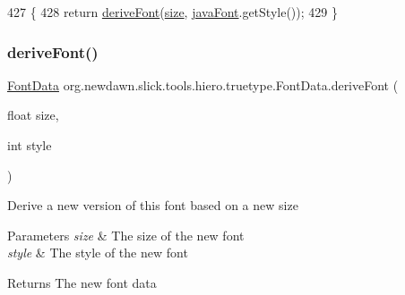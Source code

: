 \begin{DoxyCode}
427                                            \{
428         \textcolor{keywordflow}{return} \mbox{\hyperlink{classorg_1_1newdawn_1_1slick_1_1tools_1_1hiero_1_1truetype_1_1_font_data_a15b684f10d110c105f3343f2651c7291}{deriveFont}}(\mbox{\hyperlink{classorg_1_1newdawn_1_1slick_1_1tools_1_1hiero_1_1truetype_1_1_font_data_a96af538e2a7368fdba46ffc2ad6a9a0e}{size}}, \mbox{\hyperlink{classorg_1_1newdawn_1_1slick_1_1tools_1_1hiero_1_1truetype_1_1_font_data_ab48e0ef57ae93083499407b9998d93a6}{javaFont}}.getStyle());
429     \}
\end{DoxyCode}
\mbox{\label{classorg_1_1newdawn_1_1slick_1_1tools_1_1hiero_1_1truetype_1_1_font_data_adc39e9ffe35a2f9568e99b18cd59e876}} 
\subsubsection{\texorpdfstring{derive\+Font()}{deriveFont()}\hspace{0.1cm}{\footnotesize\ttfamily [2/2]}}
{\footnotesize\ttfamily \mbox{\hyperlink{classorg_1_1newdawn_1_1slick_1_1tools_1_1hiero_1_1truetype_1_1_font_data}{Font\+Data}} org.\+newdawn.\+slick.\+tools.\+hiero.\+truetype.\+Font\+Data.\+derive\+Font (\begin{DoxyParamCaption}\item[{float}]{size,  }\item[{int}]{style }\end{DoxyParamCaption})\hspace{0.3cm}{\ttfamily [inline]}}

Derive a new version of this font based on a new size


\begin{DoxyParams}{Parameters}
{\em size} & The size of the new font \\
\hline
{\em style} & The style of the new font \\
\hline
\end{DoxyParams}
\begin{DoxyReturn}{Returns}
The new font data 
\end{DoxyReturn}

